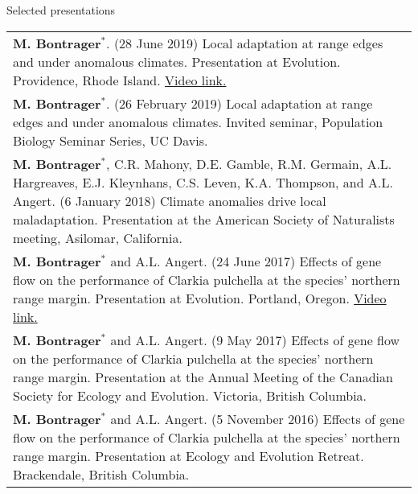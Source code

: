 \documentclass[letterpaper,11pt,oneside]{article}
\begin{document}

\noindent\Large{Selected presentations}  
\normalsize
\bigskip

\def\arraystretch{1.2}
\noindent \begin{tabular}{@{} >{\raggedright\arraybackslash}p{16.51cm}}
\textbf{M. Bontrager}$^{*}$. (28 June 2019) Local adaptation at range edges and under anomalous climates. Presentation at Evolution. Providence, Rhode Island. \href{https://www.youtube.com/watch?v=UeK_zYEfVyA}{Video link.} \\
\textbf{M. Bontrager}$^{*}$. (26 February 2019) Local adaptation at range edges and under anomalous climates. Invited seminar, Population Biology Seminar Series, UC Davis. \\
\textbf{M. Bontrager}$^{*}$, C.R. Mahony, D.E. Gamble, R.M. Germain, A.L. Hargreaves, E.J. Kleynhans, C.S. Leven, K.A. Thompson, and A.L. Angert. (6 January 2018) Climate anomalies drive local maladaptation. Presentation at the American Society of Naturalists meeting, Asilomar, California. \\
\textbf{M. Bontrager}$^{*}$ and A.L. Angert. (24 June 2017) Effects of gene flow on the performance of Clarkia pulchella at the species’ northern range margin. Presentation at Evolution. Portland, Oregon. \href{https://www.youtube.com/watch?v=HqVgQzIJLyA}{Video link.} \\
\textbf{M. Bontrager}$^{*}$ and A.L. Angert. (9 May 2017) Effects of gene flow on the performance of Clarkia pulchella at the species’ northern range margin. Presentation at the Annual Meeting of the Canadian Society for Ecology and Evolution. Victoria, British Columbia. \\
\textbf{M. Bontrager}$^{*}$ and A.L. Angert. (5 November 2016) Effects of gene flow on the performance of Clarkia pulchella at the species’ northern range margin. Presentation at Ecology and Evolution Retreat. Brackendale, British Columbia. \\
\end{tabular}
\def\arraystretch{1.2}
\end{document}
